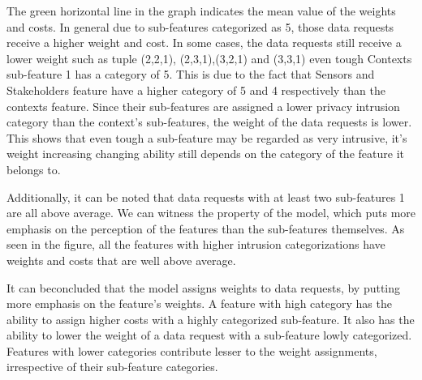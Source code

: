 The green horizontal line in the graph indicates the mean value of the weights and costs. In general due to sub-features categorized as 5, those data requests receive a higher weight and cost. In some cases, the data requests still receive a lower weight such as tuple (2,2,1),
(2,3,1),(3,2,1) and (3,3,1) even tough Contexts sub-feature 1 has a category of 5. This is due to the fact that Sensors  and Stakeholders feature have a higher category of 5 and 4 respectively than the contexts feature. Since their sub-features are assigned a lower privacy intrusion category than the context's sub-features, the weight of the data requests is lower. This shows that even tough a sub-feature may be regarded as very intrusive, it's weight increasing changing ability still depends on the category of the feature it belongs to.

Additionally, it can be noted that data requests with at least two sub-features 1 are all above average. We can witness the property of the model, which puts more emphasis on the perception of the features than the sub-features themselves. As seen in the figure, all the features with higher intrusion categorizations have weights and costs that are well above average.

It can  beconcluded that the model assigns weights to data requests, by putting more emphasis on the feature's weights. A feature with high category
has the ability to assign higher costs with a highly categorized sub-feature. It also has the ability to lower the weight of a data request with a sub-feature lowly
categorized. Features with lower categories contribute lesser to the weight assignments, irrespective of their sub-feature categories.







